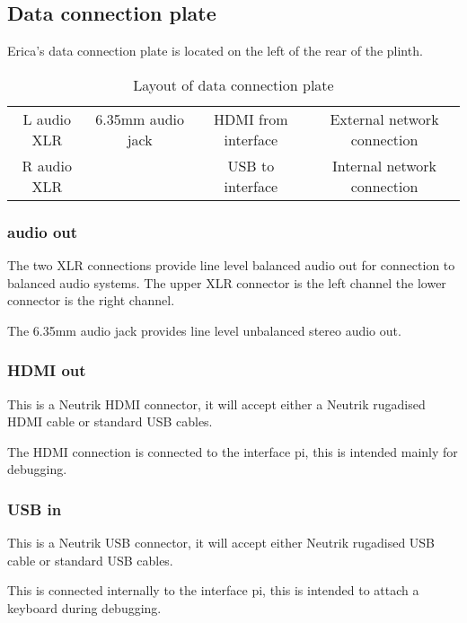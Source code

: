 \subsection{Data connection plate}

Erica's data connection plate is located on the left of the rear of the plinth.

\begin{table}[h]


\begin{tabular}[h]{cccc}

L audio XLR & 6.35mm audio jack & HDMI from interface & External network connection \\
R audio XLR & & USB to interface & Internal network connection \\

\end{tabular}

\caption{Layout of data connection plate}

\end{table}

\subsubsection{audio out}

The two XLR connections provide line level balanced audio out for connection to balanced audio systems. 
The upper XLR connector is the left channel the lower connector is the right channel.

The 6.35mm audio jack provides line level unbalanced stereo audio out.

\subsubsection{HDMI out}

This is a Neutrik HDMI connector, it will accept either a Neutrik rugadised HDMI cable or standard USB cables.

The HDMI connection is connected to the interface pi, this is intended mainly for debugging.

\subsubsection{USB in}

This is a Neutrik USB connector, it will accept either Neutrik rugadised USB cable or standard USB cables.

This is connected internally to the interface pi, this is intended to attach a keyboard during debugging.

